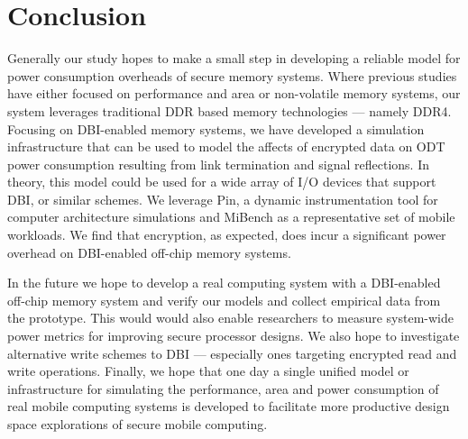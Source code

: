 \section{Conclusion}
\label{sec-conclusions}

Generally our study hopes to make a small step in developing a reliable model
for power consumption overheads of secure memory systems. Where previous
studies have either focused on performance and area or non-volatile memory
systems, our system leverages traditional DDR based memory technologies ---
namely DDR4. Focusing on DBI-enabled memory systems, we have developed a
simulation infrastructure that can be used to model the affects of encrypted
data on ODT power consumption resulting from link termination and signal
reflections. In theory, this model could be used for a wide array of I/O
devices that support DBI, or similar schemes. We leverage Pin, a dynamic
instrumentation tool for computer architecture simulations and MiBench as a
representative set of mobile workloads. We find that encryption, as expected,
does incur a significant power overhead on DBI-enabled off-chip memory systems.

In the future we hope to develop a real computing system with a DBI-enabled
off-chip memory system and verify our models and collect empirical data from
the prototype. This would would also enable researchers to measure system-wide
power metrics for improving secure processor designs. We also hope to
investigate alternative write schemes to DBI --- especially ones targeting
encrypted read and write operations. Finally, we hope that one day a single
unified model or infrastructure for simulating the performance, area and power
consumption of real mobile computing systems is developed to facilitate more
productive design space explorations of secure mobile computing.
